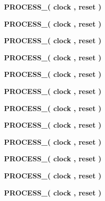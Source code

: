 \begin{DoxyCompactItemize}
\item 
{\bf P\+R\+O\+C\+E\+S\+S\+\_}{\bfseries  ( {\bfseries {\bfseries {\bf clock}} \textcolor{vhdlchar}{ }} , {\bfseries {\bfseries {\bf reset}} \textcolor{vhdlchar}{ }} )}
\item 
{\bf P\+R\+O\+C\+E\+S\+S\+\_}{\bfseries  ( {\bfseries {\bfseries {\bf clock}} \textcolor{vhdlchar}{ }} , {\bfseries {\bfseries {\bf reset}} \textcolor{vhdlchar}{ }} )}
\item 
{\bf P\+R\+O\+C\+E\+S\+S\+\_}{\bfseries  ( {\bfseries {\bfseries {\bf clock}} \textcolor{vhdlchar}{ }} , {\bfseries {\bfseries {\bf reset}} \textcolor{vhdlchar}{ }} )}
\item 
{\bf P\+R\+O\+C\+E\+S\+S\+\_}{\bfseries  ( {\bfseries {\bfseries {\bf clock}} \textcolor{vhdlchar}{ }} , {\bfseries {\bfseries {\bf reset}} \textcolor{vhdlchar}{ }} )}
\item 
{\bf P\+R\+O\+C\+E\+S\+S\+\_}{\bfseries  ( {\bfseries {\bfseries {\bf clock}} \textcolor{vhdlchar}{ }} , {\bfseries {\bfseries {\bf reset}} \textcolor{vhdlchar}{ }} )}
\item 
{\bf P\+R\+O\+C\+E\+S\+S\+\_}{\bfseries  ( {\bfseries {\bfseries {\bf clock}} \textcolor{vhdlchar}{ }} , {\bfseries {\bfseries {\bf reset}} \textcolor{vhdlchar}{ }} )}
\item 
{\bf P\+R\+O\+C\+E\+S\+S\+\_}{\bfseries  ( {\bfseries {\bfseries {\bf clock}} \textcolor{vhdlchar}{ }} , {\bfseries {\bfseries {\bf reset}} \textcolor{vhdlchar}{ }} )}
\item 
{\bf P\+R\+O\+C\+E\+S\+S\+\_}{\bfseries  ( {\bfseries {\bfseries {\bf clock}} \textcolor{vhdlchar}{ }} , {\bfseries {\bfseries {\bf reset}} \textcolor{vhdlchar}{ }} )}
\item 
{\bf P\+R\+O\+C\+E\+S\+S\+\_}{\bfseries  ( {\bfseries {\bfseries {\bf clock}} \textcolor{vhdlchar}{ }} , {\bfseries {\bfseries {\bf reset}} \textcolor{vhdlchar}{ }} )}
\item 
{\bf P\+R\+O\+C\+E\+S\+S\+\_}{\bfseries  ( {\bfseries {\bfseries {\bf clock}} \textcolor{vhdlchar}{ }} , {\bfseries {\bfseries {\bf reset}} \textcolor{vhdlchar}{ }} )}
\item 
{\bf P\+R\+O\+C\+E\+S\+S\+\_}{\bfseries  ( {\bfseries {\bfseries {\bf clock}} \textcolor{vhdlchar}{ }} , {\bfseries {\bfseries {\bf reset}} \textcolor{vhdlchar}{ }} )}
\item 
{\bf P\+R\+O\+C\+E\+S\+S\+\_}{\bfseries  ( {\bfseries {\bfseries {\bf clock}} \textcolor{vhdlchar}{ }} , {\bfseries {\bfseries {\bf reset}} \textcolor{vhdlchar}{ }} )}

\end{DoxyCompactItemize}
